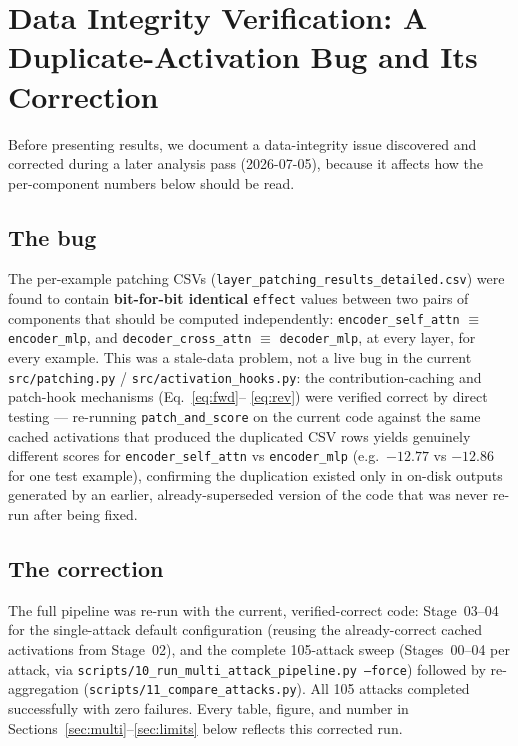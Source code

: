 \documentclass[11pt]{article}
\begin{document}
\section{Data Integrity Verification: A Duplicate-Activation Bug and Its Correction}
\label{sec:databug}

Before presenting results, we document a data-integrity issue discovered
and corrected during a later analysis pass (2026-07-05), because it
affects how the per-component numbers below should be read.

\subsection{The bug}

The per-example patching CSVs (\texttt{layer\_patching\_results\_detailed.csv})
were found to contain \textbf{bit-for-bit identical} \texttt{effect} values
between two pairs of components that should be computed independently:
\texttt{encoder\_self\_attn} $\equiv$ \texttt{encoder\_mlp}, and
\texttt{decoder\_cross\_attn} $\equiv$ \texttt{decoder\_mlp}, at every layer,
for every example. This was a stale-data problem, not a live bug in the
current \texttt{src/patching.py} / \texttt{src/activation\_hooks.py}: the
contribution-caching and patch-hook mechanisms (Eq.~\eqref{eq:fwd}--
\eqref{eq:rev}) were verified correct by direct testing — re-running
\texttt{patch\_and\_score} on the current code against the same cached
activations that produced the duplicated CSV rows yields genuinely
different scores for \texttt{encoder\_self\_attn} vs \texttt{encoder\_mlp}
(e.g.\ $-12.77$ vs $-12.86$ for one test example), confirming the
duplication existed only in on-disk outputs generated by an earlier,
already-superseded version of the code that was never re-run after being
fixed.

\subsection{The correction}

The full pipeline was re-run with the current, verified-correct code:
Stage~03--04 for the single-attack default configuration (reusing the
already-correct cached activations from Stage~02), and the complete
105-attack sweep (Stages~00--04 per attack, via
\texttt{scripts/10\_run\_multi\_attack\_pipeline.py~--force}) followed by
re-aggregation (\texttt{scripts/11\_compare\_attacks.py}). All 105 attacks
completed successfully with zero failures. Every table, figure, and number
in Sections~\ref{sec:multi}--\ref{sec:limits} below reflects this corrected
run.
\end{document}
